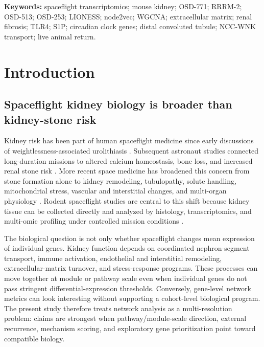 \documentclass[11pt]{article}
\begin{document}
\vspace{0.3em}
\noindent\textbf{Keywords:} spaceflight transcriptomics; mouse kidney; OSD-771; RRRM-2; OSD-513; OSD-253; LIONESS; node2vec; WGCNA; extracellular matrix; renal fibrosis; TLR4; S1P; circadian clock genes; distal convoluted tubule; NCC-WNK transport; live animal return.

\clearpage
\tableofcontents
\clearpage

\section{Introduction}

\subsection{Spaceflight kidney biology is broader than kidney-stone risk}

Kidney risk has been part of human spaceflight medicine since early discussions of weightlessness-associated urolithiasis \citep{cockett1962astronautical}. Subsequent astronaut studies connected long-duration missions to altered calcium homeostasis, bone loss, and increased renal stone risk \citep{pietrzyk2007renal,smith2014men}. More recent space medicine has broadened this concern from stone formation alone to kidney remodeling, tubulopathy, solute handling, mitochondrial stress, vascular and interstitial changes, and multi-organ physiology \citep{siew2024cosmic,chouker2025impact,afshinnekoo2020fundamental}. Rodent spaceflight studies are central to this shift because kidney tissue can be collected directly and analyzed by histology, transcriptomics, and multi-omic profiling under controlled mission conditions \citep{daSilveira2020comprehensive,galazka2020rnaseq,finch2025strain}.

The biological question is not only whether spaceflight changes mean expression of individual genes. Kidney function depends on coordinated nephron-segment transport, immune activation, endothelial and interstitial remodeling, extracellular-matrix turnover, and stress-response programs. These processes can move together at module or pathway scale even when individual genes do not pass stringent differential-expression thresholds. Conversely, gene-level network metrics can look interesting without supporting a cohort-level biological program. The present study therefore treats network analysis as a multi-resolution problem: claims are strongest when pathway/module-scale direction, external recurrence, mechanism scoring, and exploratory gene prioritization point toward compatible biology.
\end{document}
